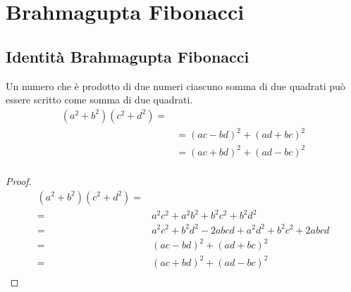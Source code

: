 \chapter{Brahmagupta Fibonacci}\label{ch:brahmagupta-fibonacci}
\section{Identità Brahmagupta Fibonacci}\label{sec:identita-brahmagupta-fibonacci}
\begin{thm}\label{thm:Brahmagupta-Fibonacci}
Un numero che è prodotto di due numeri ciascuno somma di due quadrati  può essere scritto come somma di due quadrati.
	\begin{align*}
	(a^2+b^2)(c^2+d^2)=&\\
	&=(ac-bd)^2+(ad+bc)^2\\
	&=(ac+bd)^2+(ad-bc)^2\\
	\end{align*}
\end{thm}
\begin{proof}
\begin{align*}
	(a^2+b^2)(c^2+d^2)=&\\
	=&a^2c^2+a^2b^2+b^2c^2+b^2d^2\\
	=&a^2c^2+b^2d^2-2abcd+a^2d^2+b^2c^2+2abcd\\
	=&(ac-bd)^2+(ad+bc)^2\\
	=&(ac+bd)^2+(ad-bc)^2\\
\end{align*}
\end{proof}